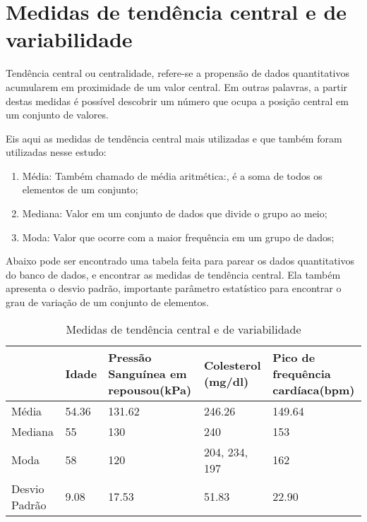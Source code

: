 \chapter{Medidas de tendência central e de variabilidade}

    Tendência central ou centralidade, refere-se a propensão de dados quantitativos acumularem
    em proximidade de um valor central. Em outras palavras, a partir destas medidas é possível 
    descobrir um número que ocupa a posição central em um conjunto de valores.

    Eis aqui as medidas de tendência central mais utilizadas e que também foram utilizadas nesse 
    estudo:

    \begin{enumerate}[label={\alph*)}]
      \addtolength{\itemindent}{1.25cm}
      \item Média: Também chamado de média aritmética:, é a soma de todos os elementos de um conjunto;
      \item Mediana: Valor em um conjunto de dados que divide o grupo ao meio;
      \item Moda: Valor que ocorre com a maior frequência em um grupo de dados;
    \end{enumerate}

    Abaixo pode ser encontrado uma tabela feita para parear os dados quantitativos do banco de dados, 
    e encontrar as medidas de tendência central. Ela também apresenta o desvio padrão, importante 
    parâmetro estatístico para encontrar o grau de variação de um conjunto de elementos.

    \begin{table}[htb]
      \caption{Medidas de tendência central e de variabilidade}
      \centering
        \begin{tabular}{ |P{2.8cm} |P{2cm}|P{3cm}|P{3cm}|P{3cm}|  }
          \hline
            & Idade & Pressão Sanguínea em repousou(kPa) & Colesterol  (mg/dl) & Pico de frequência cardíaca(bpm)\\
          \hline
          Média & 54.36 & 131.62 & 246.26 & 149.64 \\
          \hline
          Mediana & 55 & 130 & 240 & 153 \\
          \hline
          Moda & 58 & 120 & 204, 234, 197 & 162 \\
          \hline
          Desvio Padrão & 9.08 & 17.53 & 51.83 & 22.90 \\
          \hline
        \end{tabular}
    \end{table}

